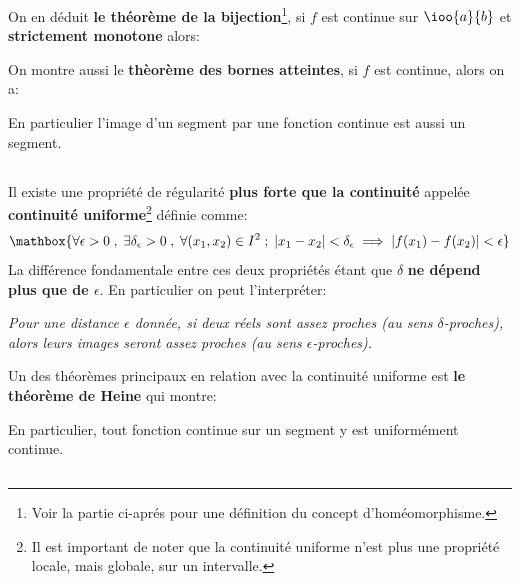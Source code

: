 On en déduit \textbf{le théorème de la bijection}\footnote[1]{Voir la partie ci-aprés pour une définition du concept d'homéomorphisme.}, si \(f\) est continue sur \(\ioo{a}{b}\) et \textbf{strictement monotone} alors:
\begin{center}
\end{center}
On montre aussi le \textbf{thèorème des bornes atteintes}, si \(f\) est continue, alors on a:
\begin{center}
\end{center}
En particulier l'image d'un segment par une fonction continue est aussi un segment.

\subsection*{}

Il existe une propriété de régularité \textbf{plus forte que la continuité} appelée \textbf{continuité uniforme}\footnote[2]{Il est important de noter que la continuité uniforme n'est plus une propriété locale, mais globale, sur un intervalle.} définie comme:
\[
   \mathbox{\forall \epsilon > 0 \; , \; \exists \delta_{\epsilon} > 0  \; , \; \forall (x_1, x_2) \in I^2 \; ; \; |x_1 - x_2| < \delta_{\epsilon} \implies |f(x_1) - f(x_2)| < \epsilon }
\]
La différence fondamentale entre ces deux propriétés étant que \(\delta\) \textbf{ne dépend plus que de \(\epsilon\)}. En particulier on peut l'interpréter:
\begin{center}
   \textit{Pour une distance \(\epsilon\) donnée, si deux réels sont assez proches (au sens \(\delta\)-proches), alors leurs images seront assez proches (au sens \(\epsilon\)-proches).}
\end{center}

Un des théorèmes principaux en relation avec la continuité uniforme est \textbf{le théorème de Heine} qui montre:
\begin{center}
\end{center}
En particulier, tout fonction continue sur un segment y est uniformément continue.

\subsection*{}


